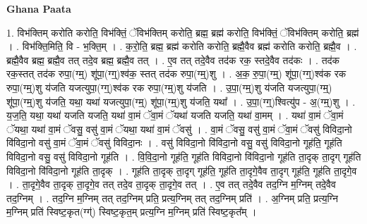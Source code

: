 \documentclass[17pt]{extarticle}
\begin{document}
\textbf{Ghana Paata } \newline

1. विभ॑क्तिम् करोति करोति॒ विभ॑क्तिं॒ ॅविभ॑क्तिम् करोति॒ ब्रह्म॒ ब्रह्म॑ करोति॒ विभ॑क्तिं॒ ॅविभ॑क्तिम् करोति॒ ब्रह्म॑ । . विभ॑क्ति॒मिति॒ वि - भ॒क्ति॒म् । . क॒रो॒ति॒ ब्रह्म॒ ब्रह्म॑ करोति करोति॒ ब्रह्मै॒वैव ब्रह्म॑ करोति करोति॒ ब्रह्मै॒व । . ब्रह्मै॒वैव ब्रह्म॒ ब्रह्मै॒व तत् तदे॒व ब्रह्म॒ ब्रह्मै॒व तत् । . ए॒व तत् तदे॒वैव तद॑क रक॒ स्तदे॒वैव तद॑कः । . तद॑क रक॒स्तत् तद॑क रुपा॒(ग्म्॒) शू॑पा॒(ग्ग्॒)श्व॑क॒ स्तत् तद॑क रुपा॒(ग्म्॒)शु । . अ॒क॒ रु॒पा॒(ग्म्॒) शू॑पा॒(ग्ग्॒)श्व॑क रक रुपा॒(ग्म्॒)शु य॑जति यजत्युपा॒(ग्ग्॒)श्व॑क रक रुपा॒(ग्म्॒)शु य॑जति । . उ॒पा॒(ग्म्॒)शु य॑जति यजत्युपा॒(ग्म्॒) शू॑पा॒(ग्म्॒)शु य॑जति॒ यथा॒ यथा॑ यजत्युपा॒(ग्म्॒) शू॑पा॒(ग्म्॒)शु य॑जति॒ यथा᳚ । . उ॒पा॒(ग्ग्॒)श्वित्यु॑प - अ॒(ग्म्॒)शु । . य॒ज॒ति॒ यथा॒ यथा॑ यजति यजति॒ यथा॑ वा॒मं ॅवा॒मं ॅयथा॑ यजति यजति॒ यथा॑ वा॒मम् । . यथा॑ वा॒मं ॅवा॒मं ॅयथा॒ यथा॑ वा॒मं ॅवसु॒ वसु॑ वा॒मं ॅयथा॒ यथा॑ वा॒मं ॅवसु॑ । . वा॒मं ॅवसु॒ वसु॑ वा॒मं ॅवा॒मं ॅवसु॑ विविदा॒नो वि॑विदा॒नो वसु॑ वा॒मं ॅवा॒मं ॅवसु॑ विविदा॒नः । . वसु॑ विविदा॒नो वि॑विदा॒नो वसु॒ वसु॑ विविदा॒नो गूह॑ति॒ गूह॑ति विविदा॒नो वसु॒ वसु॑ विविदा॒नो गूह॑ति । . वि॒वि॒दा॒नो गूह॑ति॒ गूह॑ति विविदा॒नो वि॑विदा॒नो गूह॑ति ता॒दृक् ता॒दृग् गूह॑ति विविदा॒नो वि॑विदा॒नो गूह॑ति ता॒दृक् । . गूह॑ति ता॒दृक् ता॒दृग् गूह॑ति॒ गूह॑ति ता॒दृगे॒वैव ता॒दृग् गूह॑ति॒ गूह॑ति ता॒दृगे॒व । . ता॒दृगे॒वैव ता॒दृक् ता॒दृगे॒व तत् तदे॒व ता॒दृक् ता॒दृगे॒व तत् । . ए॒व तत् तदे॒वैव तद॒ग्नि म॒ग्निम् तदे॒वैव तद॒ग्निम् । . तद॒ग्नि म॒ग्निम् तत् तद॒ग्निम् प्रति॒ प्रत्य॒ग्निम् तत् तद॒ग्निम् प्रति॑ । . अ॒ग्निम् प्रति॒ प्रत्य॒ग्नि म॒ग्निम् प्रति॑ स्विष्ट॒कृत(ग्ग्॑) स्विष्ट॒कृत॒म् प्रत्य॒ग्नि म॒ग्निम् प्रति॑ स्विष्ट॒कृत᳚म् । \newline
\end{document}

